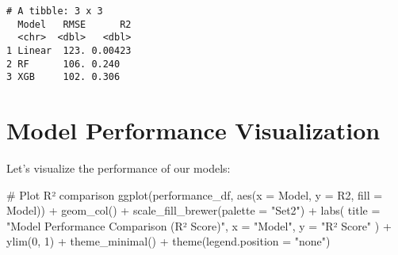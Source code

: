\documentclass[
  letterpaper,
  DIV=11,
  numbers=noendperiod]{scrreprt}
\newenvironment{Shaded}{\begin{snugshade}}{\end{snugshade}}
\newcommand{\AttributeTok}[1]{\textcolor[rgb]{0.40,0.45,0.13}{#1}}
\newcommand{\CommentTok}[1]{\textcolor[rgb]{0.37,0.37,0.37}{#1}}
\newcommand{\ControlFlowTok}[1]{\textcolor[rgb]{0.00,0.23,0.31}{#1}}
\newcommand{\DecValTok}[1]{\textcolor[rgb]{0.68,0.00,0.00}{#1}}
\newcommand{\FunctionTok}[1]{\textcolor[rgb]{0.28,0.35,0.67}{#1}}
\newcommand{\NormalTok}[1]{\textcolor[rgb]{0.00,0.23,0.31}{#1}}
\newcommand{\OtherTok}[1]{\textcolor[rgb]{0.00,0.23,0.31}{#1}}
\newcommand{\SpecialCharTok}[1]{\textcolor[rgb]{0.37,0.37,0.37}{#1}}
\newcommand{\StringTok}[1]{\textcolor[rgb]{0.13,0.47,0.30}{#1}}
\begin{document}
\begin{Shaded}
\end{Shaded}

\begin{verbatim}
# A tibble: 3 x 3
  Model   RMSE      R2
  <chr>  <dbl>   <dbl>
1 Linear  123. 0.00423
2 RF      106. 0.240  
3 XGB     102. 0.306  
\end{verbatim}

\section{Model Performance
Visualization}\label{model-performance-visualization}

Let's visualize the performance of our models:

\begin{Shaded}
\begin{Highlighting}[]
\CommentTok{\# Plot R² comparison}
\FunctionTok{ggplot}\NormalTok{(performance\_df, }\FunctionTok{aes}\NormalTok{(}\AttributeTok{x =}\NormalTok{ Model, }\AttributeTok{y =}\NormalTok{ R2, }\AttributeTok{fill =}\NormalTok{ Model)) }\SpecialCharTok{+}
  \FunctionTok{geom\_col}\NormalTok{() }\SpecialCharTok{+}
  \FunctionTok{scale\_fill\_brewer}\NormalTok{(}\AttributeTok{palette =} \StringTok{"Set2"}\NormalTok{) }\SpecialCharTok{+}
  \FunctionTok{labs}\NormalTok{(}
    \AttributeTok{title =} \StringTok{"Model Performance Comparison (R² Score)"}\NormalTok{,}
    \AttributeTok{x =} \StringTok{"Model"}\NormalTok{,}
    \AttributeTok{y =} \StringTok{"R² Score"}
\NormalTok{  ) }\SpecialCharTok{+}
  \FunctionTok{ylim}\NormalTok{(}\DecValTok{0}\NormalTok{, }\DecValTok{1}\NormalTok{) }\SpecialCharTok{+}
  \FunctionTok{theme\_minimal}\NormalTok{() }\SpecialCharTok{+}
  \FunctionTok{theme}\NormalTok{(}\AttributeTok{legend.position =} \StringTok{"none"}\NormalTok{)}
\end{Highlighting}
\end{Shaded}
\end{document}
